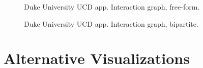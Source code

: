 \documentclass[10pt, letterpaper]{article}
\begin{document}
\begin{spacing}{1.0}
\vspace{0.25in}

\begin{figure}[H]
    \centering
    \caption{Duke University UCD app.  Interaction graph, free-form.}
    \label{fg:UCD15}
\end{figure}

\begin{figure}[H]
    \centering
    \caption{Duke University UCD app.  Interaction graph, bipartite.}
    \label{fg:UCD16}
\end{figure}


\section{Alternative Visualizations}\label{sec:altvis}


\end{spacing}
\end{document}
